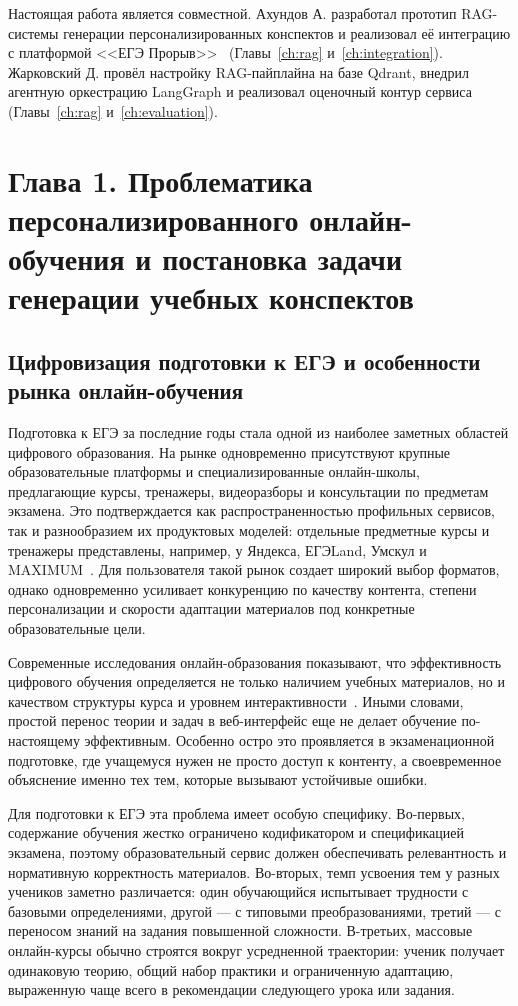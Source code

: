 \documentclass[a4paper,12pt]{extarticle}
\begin{document}
Настоящая работа является совместной. Ахундов А. разработал прототип RAG-системы генерации
персонализированных конспектов и реализовал её интеграцию с платформой <<ЕГЭ Прорыв>>~\cite{exambreakout2026}
(Главы~\ref{ch:rag} и~\ref{ch:integration}).
Жарковский Д. провёл настройку RAG-пайплайна на базе Qdrant, внедрил агентную оркестрацию
LangGraph и реализовал оценочный контур сервиса (Главы~\ref{ch:rag} и~\ref{ch:evaluation}).
\pagebreak


\section{
    Глава 1. Проблематика персонализированного онлайн-обучения 
    и постановка задачи генерации учебных конспектов
}

\subsection{Цифровизация подготовки к ЕГЭ и особенности рынка онлайн-обучения}

Подготовка к ЕГЭ за последние годы стала одной из наиболее заметных областей цифрового образования. 
На рынке одновременно присутствуют крупные образовательные платформы и специализированные онлайн-школы, 
предлагающие курсы, тренажеры, видеоразборы и консультации по предметам экзамена. 
Это подтверждается как распространенностью профильных сервисов, так и разнообразием их продуктовых моделей: 
отдельные предметные курсы и тренажеры представлены, например, 
у Яндекса, ЕГЭLand, Умскул и MAXIMUM~\cite{maximum2026ege,egeland2026,umschool2026,yandex2026ege_math}. 
Для пользователя такой рынок создает широкий выбор форматов, однако одновременно усиливает конкуренцию 
по качеству контента, степени персонализации и скорости адаптации материалов под конкретные образовательные цели.

Современные исследования онлайн-образования показывают, что эффективность цифрового обучения определяется не только 
наличием учебных материалов, но и качеством структуры курса и уровнем интерактивности~\cite{vandorresteijn2025online}. 
Иными словами, простой перенос теории и задач в веб-интерфейс еще не делает обучение по-настоящему эффективным. 
Особенно остро это проявляется в экзаменационной подготовке, где учащемуся нужен не просто доступ к контенту, 
а своевременное объяснение именно тех тем, которые вызывают устойчивые ошибки.

Для подготовки к ЕГЭ эта проблема имеет особую специфику. Во-первых, содержание обучения жестко ограничено 
кодификатором и спецификацией экзамена, поэтому образовательный сервис должен обеспечивать релевантность и 
нормативную корректность материалов. Во-вторых, темп усвоения тем у разных учеников заметно различается: один 
обучающийся испытывает трудности с базовыми определениями, другой --- с типовыми преобразованиями, третий --- 
с переносом знаний на задания повышенной сложности. В-третьих, массовые онлайн-курсы обычно строятся вокруг 
усредненной траектории: ученик получает одинаковую теорию, общий набор практики и ограниченную адаптацию, 
выраженную чаще всего в рекомендации следующего урока или задания.
\end{document}

